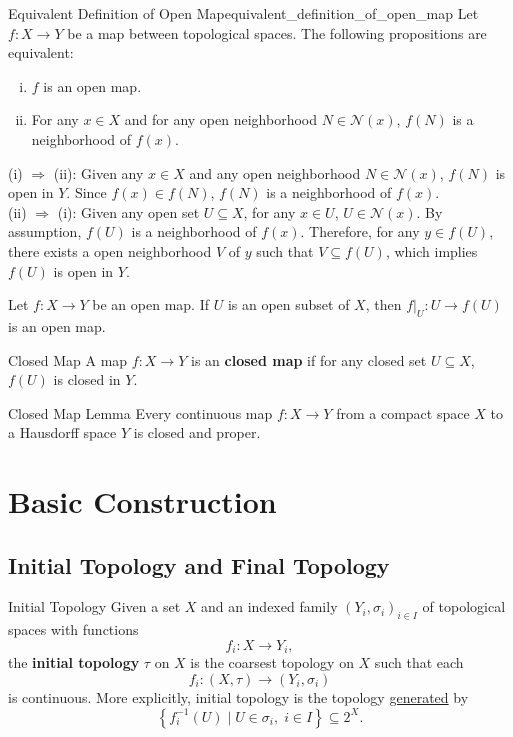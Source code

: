 \documentclass{report}
\begin{document}
\begin{proposition}{Equivalent Definition of Open Map}{equivalent_definition_of_open_map}
	Let $f:X\to Y$ be a map between topological spaces. The following propositions are equivalent:
	\begin{enumerate}[(i)]
		\item $f$ is an open map.
		\item For any $x\in X$ and for any open neighborhood $N\in\mathcal{N}(x)$, $f(N)$ is a neighborhood of $f(x)$.
	\end{enumerate}
\end{proposition}
\begin{prf}
	(i) $\Rightarrow$ (ii): Given any $x\in X$ and any open neighborhood $N\in\mathcal{N}(x)$, $f(N)$ is open in $Y$. Since $f(x)\in f(N)$, $f(N)$ is a neighborhood of $f(x)$.\\
	(ii) $\Rightarrow$ (i): Given any open set $U\subseteq X$, for any $x\in U$, $U\in\mathcal{N}(x)$. By assumption, $f(U)$ is a neighborhood of $f(x)$. Therefore, for any $y\in f(U)$, there exists a open neighborhood $V$ of $y$ such that $V\subseteq f(U)$, which implies $f(U)$ is open in $Y$.
\end{prf}

\begin{proposition}{}{}
	Let $f:X\to Y$ be an open map. If $U$ is an open subset of $X$, then $f|_U:U\to f(U)$ is an open map.
\end{proposition}


\begin{definition}{Closed Map}{}
	A map $f:X\to Y$ is an \textbf{closed map} if for any closed set $U\subseteq X$, $f(U)$ is closed in $Y$.
\end{definition}

\begin{lemma}{Closed Map Lemma}{}
	Every continuous map $f: X \rightarrow Y$ from a compact space $X$ to a Hausdorff space $Y$ is closed and proper.
\end{lemma}

\section{Basic Construction}
\subsection{Initial Topology and Final Topology}
\begin{definition}{Initial Topology}{}
	Given a set $X$ and an indexed family $\left(Y_i, \sigma_i\right)_{i \in I}$ of topological spaces with functions
	$$
	f_i: X \rightarrow Y_i,
	$$
	the \textbf{initial topology} $\tau$ on $X$ is the coarsest topology on $X$ such that each
	$$
	f_i:(X, \tau) \rightarrow (Y_i, \sigma_i)
	$$
	is continuous. More explicitly, initial topology is the topology \hyperref[th:generated_topology]{generated} by 
	\[
	\left\{ f^{-1}_i(U) \mid U\in \sigma_i, \;i \in I \right\}\subseteq 2^X.
	\]
\end{definition}
\end{document}
